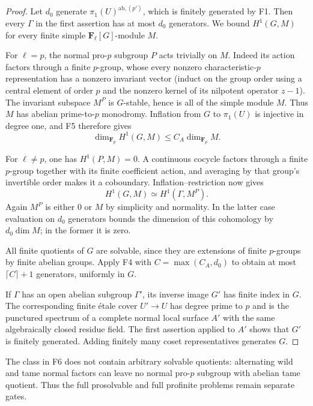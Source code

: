 \begin{proof}
Let $d_0$ generate $\pi_1(U)^{\mathrm{ab},(p')}$, which is finitely
generated by F1. Then every $\Gamma$ in the first assertion has at
most $d_0$ generators. We bound $H^1(G,M)$ for every finite simple
$\mathbf F_\ell[G]$-module $M$.

For $\ell=p$, the normal pro-$p$ subgroup $P$ acts trivially on $M$.
Indeed its action factors through a finite $p$-group, whose every
nonzero characteristic-$p$ representation has a nonzero invariant
vector (induct on the group order using a central element of order
$p$ and the nonzero kernel of its nilpotent operator $z-1$).
The invariant subspace $M^P$ is $G$-stable, hence is all of the
simple module $M$. Thus $M$ has abelian prime-to-$p$ monodromy.
Inflation from $G$ to $\pi_1(U)$ is injective in degree one, and F5
therefore gives
\[
 \dim_{\mathbf F_p}H^1(G,M)\leq C_A\dim_{\mathbf F_p}M.
\]

For $\ell\ne p$, one has $H^1(P,M)=0$. A continuous cocycle factors
through a finite $p$-group together with its finite coefficient
action, and averaging by that group's invertible order makes it a
coboundary. Inflation--restriction now gives
\[
 H^1(G,M)\simeq H^1(\Gamma,M^P).
\]
Again $M^P$ is either $0$ or $M$ by simplicity and normality. In the
latter case evaluation on $d_0$ generators bounds the dimension of
this cohomology by $d_0\dim M$; in the former it is zero.

All finite quotients of $G$ are solvable, since they are extensions
of finite $p$-groups by finite abelian groups. Apply F4 with
$C=\max(C_A,d_0)$ to obtain at most $\lceil C\rceil+1$ generators,
uniformly in $G$.

If $\Gamma$ has an open abelian subgroup $\Gamma'$, its inverse
image $G'$ has finite index in $G$. The corresponding finite \'etale
cover $U'\to U$ has degree prime to $p$ and is the punctured spectrum
of a complete normal local surface $A'$ with the same algebraically
closed residue field. The first assertion applied to $A'$ shows
that $G'$ is finitely generated. Adding finitely many coset
representatives generates $G$.
\end{proof}

The class in F6 does not contain arbitrary solvable quotients:
alternating wild and tame normal factors can leave no normal
pro-$p$ subgroup with abelian tame quotient. Thus the full
prosolvable and full profinite problems remain separate gates.

